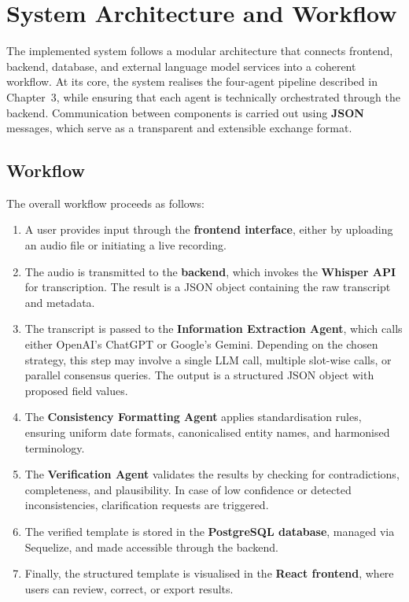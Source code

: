 \section{System Architecture and Workflow}

The implemented system follows a modular architecture that connects frontend, backend, database, and external language model services into a coherent workflow. At its core, the system realises the four-agent pipeline described in Chapter~3, while ensuring that each agent is technically orchestrated through the backend. Communication between components is carried out using \textbf{JSON} messages, which serve as a transparent and extensible exchange format.

\subsection*{Workflow}
The overall workflow proceeds as follows:

\begin{enumerate}
    \item A user provides input through the \textbf{frontend interface}, either by uploading an audio file or initiating a live recording.
    \item The audio is transmitted to the \textbf{backend}, which invokes the \textbf{Whisper API} for transcription. The result is a JSON object containing the raw transcript and metadata.
    \item The transcript is passed to the \textbf{Information Extraction Agent}, which calls either OpenAI’s ChatGPT or Google’s Gemini. Depending on the chosen strategy, this step may involve a single LLM call, multiple slot-wise calls, or parallel consensus queries. The output is a structured JSON object with proposed field values.
    \item The \textbf{Consistency Formatting Agent} applies standardisation rules, ensuring uniform date formats, canonicalised entity names, and harmonised terminology.
    \item The \textbf{Verification Agent} validates the results by checking for contradictions, completeness, and plausibility. In case of low confidence or detected inconsistencies, clarification requests are triggered.
    \item The verified template is stored in the \textbf{PostgreSQL database}, managed via Sequelize, and made accessible through the backend.
    \item Finally, the structured template is visualised in the \textbf{React frontend}, where users can review, correct, or export results.
\end{enumerate}

